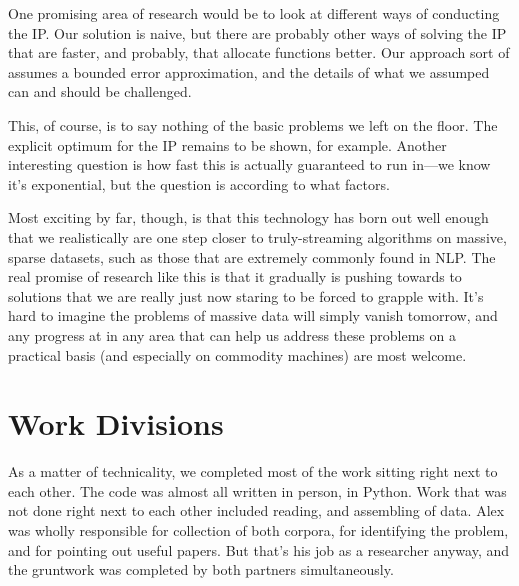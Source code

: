 \documentclass[11pt]{article}
\begin{document}
One promising area of research would be to look at different ways of conducting the IP. Our solution is naive, but there are probably other ways of solving the IP that are faster, and probably, that allocate functions better. Our approach sort of assumes a bounded error approximation, and the details of what we assumped can and should be challenged.

This, of course, is to say nothing of the basic problems we left on the floor. The explicit optimum for the IP remains to be shown, for example. Another interesting question is how fast this is actually guaranteed to run in---we know it's exponential, but the question is according to what factors.

Most exciting by far, though, is that this technology has born out well enough that we realistically are one step closer to truly-streaming algorithms on massive, sparse datasets, such as those that are extremely commonly found in NLP. The real promise of research like this is that it gradually is pushing towards to solutions that we are really just now staring to be forced to grapple with. It's hard to imagine the problems of massive data will simply vanish tomorrow, and any progress at in any area that can help us address these problems on a practical basis (and especially on commodity machines) are most welcome.


\section{Work Divisions}

As a matter of technicality, we completed most of the work sitting right next to each other. The code was almost all written in person, in Python. Work that was not done right next to each other included reading, and assembling of data. Alex was wholly responsible for collection of both corpora, for identifying the problem, and for pointing out useful papers. But that's his job as a researcher anyway, and the gruntwork was completed by both partners simultaneously.
\end{document}
